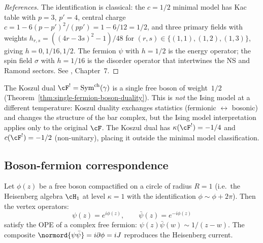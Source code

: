 \begin{proof}[References]
The identification is classical: the $c = 1/2$
minimal model has Kac table with $p = 3$, $p' = 4$,
central charge
$c = 1 - 6(p-p')^2/(pp') = 1 - 6/12 = 1/2$,
and three primary fields with weights
$h_{r,s} = ((4r - 3s)^2 - 1)/48$
for $(r,s) \in \{(1,1), (1,2), (1,3)\}$, giving
$h = 0, 1/16, 1/2$. The fermion $\psi$ with
$h = 1/2$ is the energy operator; the spin field $\sigma$
with $h = 1/16$ is the disorder operator that intertwines
the NS and Ramond sectors. See
\cite{DiFrancesco1997}, Chapter~7.
\end{proof}

\begin{remark}
\label{rem:ising-koszul}
The Koszul dual $\cF^!
= \mathrm{Sym}^{\mathrm{ch}}(\gamma)$ is a single free boson
of weight~$1/2$
\textup{(}Theorem~\textup{\ref{thm:single-fermion-boson-duality})}.
This is \emph{not} the Ising model at a different temperature:
Koszul duality exchanges statistics
(fermionic $\leftrightarrow$ bosonic) and changes the structure
of the bar complex, but the Ising model interpretation applies
only to the original $\cF$. The Koszul dual has
$\kappa(\cF^!) = -1/4$ and $c(\cF^!) = -1/2$
(non-unitary), placing it outside the minimal model
classification.
\end{remark}

\subsection{Boson-fermion correspondence}
\label{subsec:boson-fermion-correspondence}

\begin{proposition}
\label{prop:bosonization}
Let $\phi(z)$ be a free boson compactified on a circle of
radius $R = 1$ \textup{(}i.e.\ the Heisenberg algebra
$\cH_1$ at level $\kappa = 1$ with the identification
$\phi \sim \phi + 2\pi$\textup{)}. Then the vertex operators:
\begin{equation}\label{eq:bosonization}
\psi(z) = e^{i\phi(z)}, \qquad
\bar\psi(z) = e^{-i\phi(z)}
\end{equation}
satisfy the OPE of a \textup{complex} free fermion:
$\psi(z)\bar\psi(w) \sim 1/(z{-}w)$. The composite
$\normord{\psi\bar\psi} = i\partial\phi = iJ$ reproduces
the Heisenberg current.
\end{proposition}

